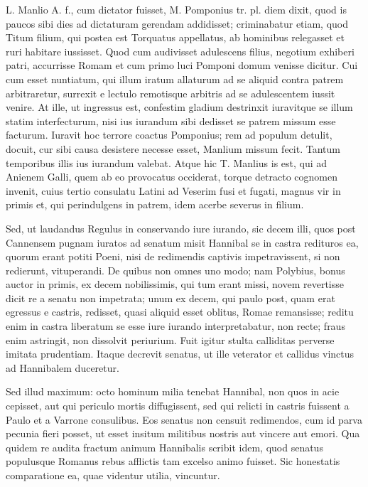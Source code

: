  L. Manlio A. f., cum dictator fuisset, M. Pomponius tr. pl. diem dixit, quod is paucos sibi dies ad dictaturam gerendam addidisset; criminabatur etiam, quod Titum filium, qui postea est Torquatus appellatus, ab hominibus relegasset et ruri habitare iussisset. Quod cum audivisset adulescens filius, negotium exhiberi patri, accurrisse Romam et cum primo luci Pomponi domum venisse dicitur. Cui cum esset nuntiatum, qui illum iratum allaturum ad se aliquid contra patrem arbitraretur, surrexit e lectulo remotisque arbitris ad se adulescentem iussit venire. At ille, ut ingressus est, confestim gladium destrinxit iuravitque se illum statim interfecturum, nisi ius iurandum sibi dedisset se patrem missum esse facturum. Iuravit hoc terrore coactus Pomponius; rem ad populum detulit, docuit, cur sibi causa desistere necesse esset, Manlium missum fecit. Tantum temporibus illis ius iurandum valebat. Atque hic T. Manlius is est, qui ad Anienem Galli, quem ab eo provocatus occiderat, torque detracto cognomen invenit, cuius tertio consulatu Latini ad Veserim fusi et fugati, magnus vir in primis et, qui perindulgens in patrem, idem acerbe severus in filium.

 Sed, ut laudandus Regulus in conservando iure iurando, sic decem illi, quos post Cannensem pugnam iuratos ad senatum misit Hannibal se in castra redituros ea, quorum erant potiti Poeni, nisi de redimendis captivis impetravissent, si non redierunt, vituperandi. De quibus non omnes uno modo; nam Polybius, bonus auctor in primis, ex decem nobilissimis, qui tum erant missi, novem revertisse dicit re a senatu non impetrata; unum ex decem, qui paulo post, quam erat egressus e castris, redisset, quasi aliquid esset oblitus, Romae remansisse; reditu enim in castra liberatum se esse iure iurando interpretabatur, non recte; fraus enim astringit, non dissolvit periurium. Fuit igitur stulta calliditas perverse imitata prudentiam. Itaque decrevit senatus, ut ille veterator et callidus vinctus ad Hannibalem duceretur.

 Sed illud maximum: octo hominum milia tenebat Hannibal, non quos in acie cepisset, aut qui periculo mortis diffugissent, sed qui relicti in castris fuissent a Paulo et a Varrone consulibus. Eos senatus non censuit redimendos, cum id parva pecunia fieri posset, ut esset insitum militibus nostris aut vincere aut emori. Qua quidem re audita fractum animum Hannibalis scribit idem, quod senatus populusque Romanus rebus afflictis tam excelso animo fuisset. Sic honestatis comparatione ea, quae videntur utilia, vincuntur.

